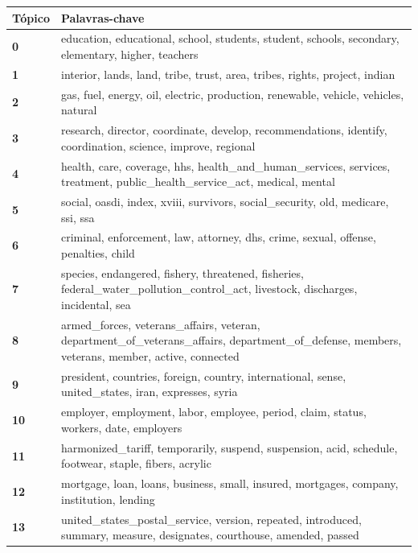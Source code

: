 \begin{table}[htpb]
    \centering
    \scriptsize
    \begin{tabularx}{\textwidth}{@{}l X@{}}
        \toprule
        \textbf{Tópico} & \textbf{Palavras-chave} \\
        \midrule
        \textbf{0} & education, educational, school, students, student, schools, secondary, elementary, higher, teachers \\
        \textbf{1} & interior, lands, land, tribe, trust, area, tribes, rights, project, indian \\
        \textbf{2} & gas, fuel, energy, oil, electric, production, renewable, vehicle, vehicles, natural \\
        \textbf{3} & research, director, coordinate, develop, recommendations, identify, coordination, science, improve, regional \\
        \textbf{4} & health, care, coverage, hhs, health\_and\_human\_services, services, treatment, public\_health\_service\_act, medical, mental \\
        \textbf{5} & social, oasdi, index, xviii, survivors, social\_security, old, medicare, ssi, ssa \\
        \textbf{6} & criminal, enforcement, law, attorney, dhs, crime, sexual, offense, penalties, child \\
        \textbf{7} & species, endangered, fishery, threatened, fisheries, federal\_water\_pollution\_control\_act, livestock, discharges, incidental, sea \\
        \textbf{8} & armed\_forces, veterans\_affairs, veteran, department\_of\_veterans\_affairs, department\_of\_defense, members, veterans, member, active, connected \\
        \textbf{9} & president, countries, foreign, country, international, sense, united\_states, iran, expresses, syria \\
        \textbf{10} & employer, employment, labor, employee, period, claim, status, workers, date, employers \\
        \textbf{11} & harmonized\_tariff, temporarily, suspend, suspension, acid, schedule, footwear, staple, fibers, acrylic \\
        \textbf{12} & mortgage, loan, loans, business, small, insured, mortgages, company, institution, lending \\
        \textbf{13} & united\_states\_postal\_service, version, repeated, introduced, summary, measure, designates, courthouse, amended, passed \\

\end{tabularx}
\end{table}
